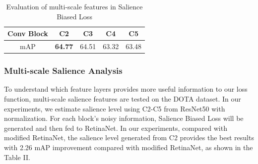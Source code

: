 \documentclass[conference]{IEEEtran}
\begin{document}
    


    \begin{table}[htbp]
    	\caption{Evaluation of multi-scale features in Salience Biased Loss}
    	\begin{center}
    	\begin{tabular}{|c|c|c|c|c|}
    	\hline

    	\textbf{Conv Block}&\textbf{C2}&\textbf{C3}&\textbf{C4}&\textbf{C5} \\ \hline
    	mAP &\textbf{64.77} & 64.51& 63.32& 63.48\\ \hline
    	\end{tabular}
    	\label{tab:final}
    	\end{center}
    \end{table}
    \subsubsection{Multi-scale Salience Analysis}
    To understand which feature layers provides more useful information to our loss function, multi-scale salience features are tested on the DOTA dataset. In our experiments, we estimate salience level using C2-C5 from ResNet50\cite{he2016deep} with normalization. For each block's noisy information, Salience Biased Loss will be generated and then fed to RetinaNet\cite{lin2017focal}. In our experiments, compared with modified RetinaNet\cite{lin2017focal}, the salience level generated from C2 provides the best results with 2.26 mAP improvement compared with modified RetinaNet, as shown in the Table II.
\end{document}
